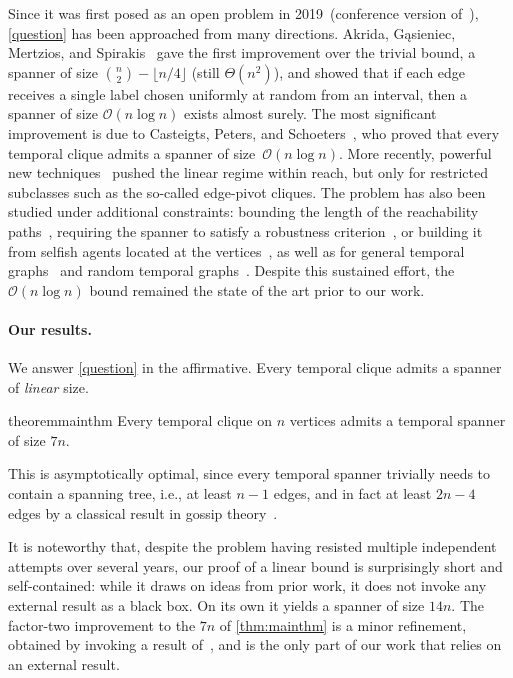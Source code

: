 \documentclass[11pt, letterpaper]{article}
\newcommand{\bigO}{\mathcal{O}}
\theoremstyle{definition}
\theoremstyle{plain}
\begin{document}
Since it was first posed as an open problem in 2019~(conference version of~\cite{Casteigts21}), \cref{question} has been approached from many directions.
Akrida, Gąsieniec, Mertzios, and Spirakis~\cite{AkridaGMS17} gave the first improvement over the trivial bound, a spanner of size $\binom{n}{2}-\lfloor n/4\rfloor$ (still $\Theta(n^2)$), and showed that if each edge receives a single label chosen uniformly at random from an interval, then a spanner of size $\bigO(n\log n)$ exists almost surely.
The most significant improvement is due to Casteigts, Peters, and Schoeters~\cite{Casteigts21}, who proved that every temporal clique admits a spanner of size~$\bigO(n\log n)$.
More recently, powerful new techniques~\cite{Angrick24,Carnevale25} pushed the linear regime within reach, but only for restricted subclasses such as the so-called edge-pivot cliques.
The problem has also been studied under additional constraints: bounding the length of the reachability paths~\cite{BiloESA22}, requiring the spanner to satisfy a robustness criterion~\cite{BiloDGLR24}, or building it from selfish agents located at the vertices~\cite{TemporalNetworkCreationGames23,
TemporalNetworkCreationGames25}, as well as for general temporal graphs~\cite{KempeKK00,AxiotisF16} and random temporal graphs~\cite{CasteigtsRandom}.
Despite this sustained effort, the~$\bigO(n\log n)$ bound remained the state of the art prior to our work.



\paragraph{Our results.}
We answer \cref{question} in the affirmative. 
Every temporal clique admits a spanner of \emph{linear} size.

\begin{restatable}{theorem}{mainthm}
\label{thm:mainthm}
Every temporal clique on $n$ vertices admits a temporal spanner of size $7n$.
\end{restatable}

This is asymptotically optimal, since every temporal spanner trivially needs to contain a spanning tree, i.e., at least $n-1$ edges, and in fact at least $2n-4$ edges by a classical result in gossip theory~\cite{bumby1981}.

It is noteworthy that, despite the problem having resisted multiple independent attempts over several years, our proof of a linear bound is surprisingly short and self-contained: while it draws on ideas from prior work, it does not invoke any external result as a black box.
On its own it yields a spanner of size $14n$. The factor-two improvement to the $7n$ of \cref{thm:mainthm} is a minor refinement, obtained by invoking a result of~\cite{Carnevale25}, and is the only part of our work that relies on an external result.
\end{document}
